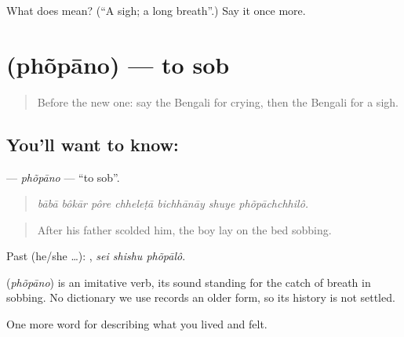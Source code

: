 \begin{tcolorbox}[breakable,colback=teal!4,colframe=teal!35!black,title={Before you move on}]
What does  mean? (\textquotedblleft{}A sigh; a long breath\textquotedblright{}.) Say it once more.
\end{tcolorbox}
\section[\texorpdfstring{\bn{ফোঁপানো} (phõpāno)}{ফোঁপানো (phõpāno)}]{ (phõpāno) — to sob}

\label{lesson:BN-C445-phopano}



\begin{quote}
Before the new one: say the Bengali for crying, then the Bengali for a sigh.
\end{quote}

\subsection*{You'll want to know: }
\textbf{} — \emph{phõpāno} — \textquotedblleft{}to sob\textquotedblright{}.

\begin{quote}
      
\end{quote}

\begin{quote}
\emph{bābā bôkār pôre chheleṭā bichhānāy shuye phõpāchchhilô.}
\end{quote}

\begin{quote}
After his father scolded him, the boy lay on the bed sobbing.
\end{quote}

Past (he/she …):   , \emph{sei shishu phõpālô}.

\begin{cousinweb}
\textbf{} (\emph{phõpāno}) is an imitative verb, its sound standing for the catch of breath in sobbing. No dictionary we use records an older form, so its history is not settled.
\end{cousinweb}

\begin{grammarlens}[title={What you've built}]
One more word for describing what you lived and felt.
\end{grammarlens}

